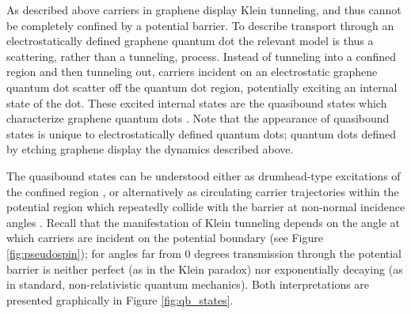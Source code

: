 \documentclass[edeposit,fullpage,draftthesis]{uiucthesis2009}
\begin{document}
        
        As described above carriers in graphene display Klein tunneling, and thus cannot be completely confined
        by a potential barrier. To describe transport through an electrostatically defined graphene quantum dot
        the relevant model is thus a scattering, rather than a tunneling, process.
        Instead of tunneling into a confined region and then tunneling out, carriers incident on an electrostatic
        graphene quantum dot scatter off the quantum dot region, potentially exciting an internal state of the dot.
        These excited internal states are the quasibound states which characterize graphene quantum dots
        \cite{pereira2006confined, silvestrov2007quantum, matulis2008quasibound, nguyen2009quasi}.
        Note that the appearance of quasibound states is unique to electrostatically defined quantum dots; 
        quantum dots defined by etching graphene display the dynamics described above.
        
        The quasibound states can be understood either as drumhead-type excitations of the confined region \cite{heinisch2013mie},
        or alternatively as circulating carrier trajectories within the potential region which repeatedly 
        collide with the barrier at non-normal incidence angles \cite{bardarson2009electrostatic}. Recall
        that the manifestation of Klein tunneling depends on the angle at which carriers
        are incident on the potential boundary (see Figure \ref{fig:pseudospin}); for angles far from 0 degrees
        transmission through the potential barrier is neither perfect (as in the Klein paradox) nor 
        exponentially decaying (as in standard, non-relativistic quantum mechanics).
        Both interpretations are presented graphically in Figure \ref{fig:qb_states}.
        
\end{document}
